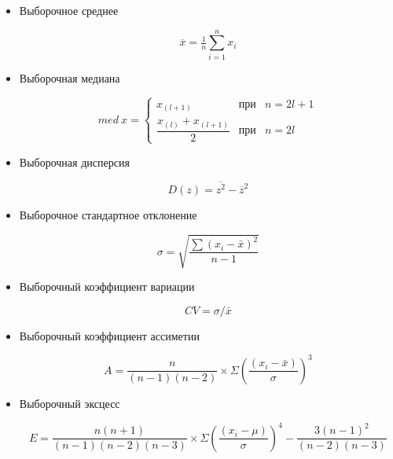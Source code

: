 \documentclass[12pt,a4paper]{article}
\begin{document}
	\begin{itemize}
		\item Выборочное среднее

		\begin{equation} \label{eq:mean}
			\overline{x} = \tfrac{1}{n}\sum_{i = 1}^{n}x_i
		\end{equation}

		\item Выборочная медиана

		\begin{equation} \label{eq:median}
			med\ x = \left\{
			\begin{array}{ccl}
			x_{(l + 1)} & \text{при} & n = 2l + 1\\
			\dfrac{x_{(l)} + x_{(l + 1)}}{2} & \text{при} & n = 2l
			\end{array}
			\right.
		\end{equation}

		\item Выборочная дисперсия

		\begin{equation} \label{eq:dispersion}
			D(z) = \overline{z^2} - \overline{z}^2
		\end{equation}

		\item Выборочное стандартное отклонение

		\begin{equation}
			\sigma = \sqrt{\frac{\sum (x_i - \bar x)^2}{n - 1}}
		\end{equation}

		\item Выборочный коэффициент вариации

		\begin{equation}
			CV = \sigma / \bar x
		\end{equation}

		\item Выборочный коэффициент ассиметии

		\begin{equation}
			A = \frac{n}{(n-1)(n-2)} \times \Sigma \left(\frac{(x_i - \bar x)}{\sigma}\right)^3
		\end{equation}

		\item Выборочный эксцесс

		\begin{equation}
			E = \frac{n(n + 1)}{(n-1)(n-2)(n-3)} \times \Sigma \left(\frac{(x_i - \mu)}{\sigma}\right)^4 - \frac{3(n - 1)^2}{(n - 2)(n - 3)}
		\end{equation}
	\end{itemize}
\end{document}
